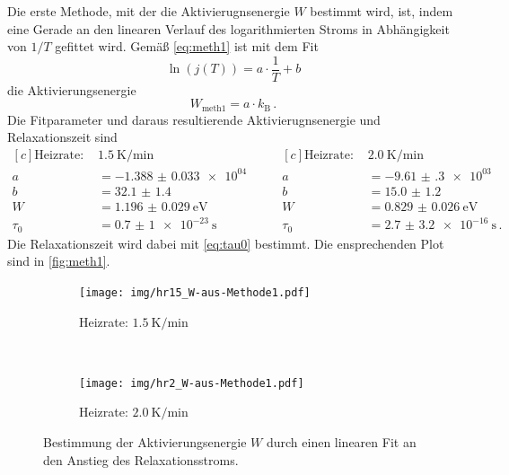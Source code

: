 Die erste Methode, mit der die Aktivierugnsenergie $W$ bestimmt wird, ist, indem eine Gerade an den linearen Verlauf des logarithmierten Stroms in Abhängigkeit von $1/T$ gefittet wird. Gemäß \autoref{eq:meth1} ist mit dem Fit
\begin{equation}
  \ln{(j(T))} = a \cdot \frac{1}{T} + b
\end{equation}
die Aktivierungsenergie
\begin{equation*}
  W_\text{meth1} = a \cdot k_\text{B}\,.
\end{equation*}
Die Fitparameter und daraus resultierende Aktivierugnsenergie und Relaxationszeit sind
\begin{equation*}
\begin{aligned}[c]
  \text{Heizrate: }& \SI{1.5}{\kelvin\per\minute}\\
  a &= \num{-1.388(33)e+04}\\
  b &= \num{32.1(14)}\\
  W &= \SI{1.196(29)}{\electronvolt}\\
  \tau_0 &= \SI{0.7(10)e-23}{\second}
\end{aligned}
\qquad
\begin{aligned}[c]
  \text{Heizrate: }& \SI{2.0}{\kelvin\per\minute}\\
  a &= \num{-9.61(30)e+03}\\
  b &= \num{15.0(12)}\\
  W &= \SI{0.829(26)}{\electronvolt}\\
  \tau_0 &= \SI{2.7(32)e-16}{\second}\,.
\end{aligned}
\end{equation*}
Die Relaxationszeit wird dabei mit \autoref{eq:tau0} bestimmt. Die ensprechenden Plot sind in \autoref{fig:meth1}.
\begin{figure}[htp]
    \centering
    \begin{subfigure}[t]{0.5\textwidth}
        \centering
        \texttt{[image: img/hr15\_W-aus-Methode1.pdf]}
        \caption{Heizrate: $\SI{1.5}{\kelvin\per\minute}$}
    \end{subfigure}%
    ~
    \begin{subfigure}[t]{0.5\textwidth}
        \centering
        \texttt{[image: img/hr2\_W-aus-Methode1.pdf]}
        \caption{Heizrate: $\SI{2.0}{\kelvin\per\minute}$}
    \end{subfigure}
    \caption{Bestimmung der Aktivierungsenergie $W$ durch einen linearen Fit an den Anstieg des Relaxationsstroms.}
    \label{fig:meth1}
\end{figure}

